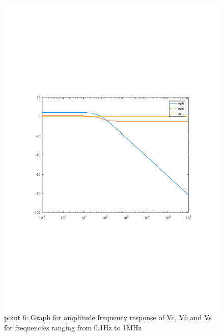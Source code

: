 \begin{figure}[H] \centering
\includegraphics[width=0.9\linewidth]{freq_resp_tab.pdf}
\caption{point 6: Graph for amplitude frequency response of Vc, V6 and Vs for frequencies ranging from 0.1Hz to 1MHz}
\label{fig:freq_resp}
\end{figure}



